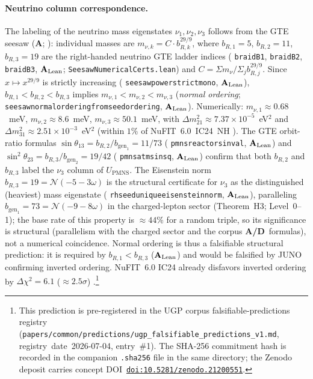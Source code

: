\documentclass[11pt]{article}
\theoremstyle{remark}
\newcommand{\lean}[1]{%
  \penalty-100
  \begingroup\def\_{\textunderscore\allowbreak}\texttt{#1}\endgroup}
\newcommand{\CatA}{\textbf{A}}
\newcommand{\CatAL}{\ensuremath{\textbf{A}_{\rm Lean}}}
\newcommand{\CatAD}{\textbf{A/D}}
\begin{document}
\paragraph*{Neutrino column correspondence.}
The labeling of the neutrino mass eigenstates $\nu_1,\nu_2,\nu_3$ follows from the
GTE seesaw (\CatA; \cite{SpivackNeutrino}): individual masses are
$m_{\nu,k} = C\cdot b_{R,k}^{29/9}$, where $b_{R,1}=5$, $b_{R,2}=11$, $b_{R,3}=19$
are the right-handed neutrino GTE ladder indices
(\lean{braidB1}, \lean{braidB2}, \lean{braidB3}, \CatAL;
\lean{SeesawNumericalCerts.lean}) and $C = \Sigma m_\nu/\Sigma_j b_{R,j}^{29/9}$.
Since $x\mapsto x^{29/9}$ is strictly increasing
(\lean{seesaw\_power\_strict\_mono}, \CatAL), $b_{R,1}<b_{R,2}<b_{R,3}$ implies
$m_{\nu,1}<m_{\nu,2}<m_{\nu,3}$ (\emph{normal ordering};
\lean{seesaw\_normal\_ordering\_from\_seed\_ordering}, \CatAL).
Numerically: $m_{\nu,1}\approx 0.68$~meV, $m_{\nu,2}\approx 8.6$~meV,
$m_{\nu,3}\approx 50.1$~meV, with $\Delta m^2_{21}\approx 7.37\times10^{-5}$~eV$^2$
and $\Delta m^2_{31}\approx 2.51\times10^{-3}$~eV$^2$ (within $1\%$ of
NuFIT~6.0~IC24~NH \cite{NuFIT60}).
The GTE orbit-ratio formulas
$\sin\theta_{13}=b_{R,2}/b_{\mathrm{gen}_1}=11/73$ (\lean{pmns\_reactor\_sin\_val},
\CatAL) and
$\sin^2\theta_{23}=b_{R,3}/b_{\mathrm{gen}_2}=19/42$ (\lean{pmns\_atm\_sin\_sq},
\CatAL) confirm that both $b_{R,2}$ and $b_{R,3}$ label the $\nu_3$ column of
$U_{\mathrm{PMNS}}$.
The Eisenstein norm $b_{R,3}=19=\mathcal{N}(-5-3\omega)$ is the structural certificate
for $\nu_3$ as the distinguished (heaviest) mass eigenstate
(\lean{rh\_seed\_unique\_eisenstein\_norm}, \CatAL), paralleling
$b_{\mathrm{gen}_1}=73=\mathcal{N}(-9-8\omega)$ in the charged-lepton sector
(Theorem~H3; Level~0--1); the base rate of this property is ${\approx}44\%$ for a
random triple, so its significance is structural (parallelism with the charged sector
and the corpus \CatAD\ formulas), not a numerical coincidence.
Normal ordering is thus a falsifiable structural prediction: it is required by
$b_{R,1}<b_{R,3}$ (\CatAL) and would be falsified by JUNO confirming inverted ordering.
NuFIT~6.0 IC24 already disfavors inverted ordering by $\Delta\chi^2=6.1$
(${\approx}2.5\sigma$) \cite{NuFIT60}.\footnote{This prediction is pre-registered in
the UGP corpus falsifiable-predictions registry
(\texttt{papers/common/predictions/ugp\_falsifiable\_predictions\_v1.md},
registry~date~2026-07-04, entry~\#1).
The SHA-256 commitment hash is recorded in the companion
\texttt{.sha256} file in the same directory; the Zenodo deposit carries concept
DOI~\href{https://doi.org/10.5281/zenodo.21200551}{\texttt{doi:10.5281/zenodo.21200551}}.}
\end{document}
